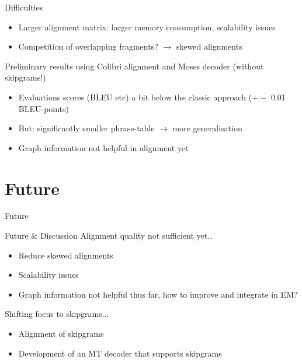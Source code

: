 \documentclass[compress]{beamer}
\begin{document}
\begin{frame}
	\begin{block}{Difficulties}
		\begin{itemize}
			\item Larger alignment matrix: larger memory consumption, scalability issues
			\item Competition of overlapping fragments? $\rightarrow$ skewed alignments
		\end{itemize}
	\end{block}

	\begin{block}{Preliminary results using Colibri alignment and Moses decoder (without skipgrams!)}
		\begin{itemize}
			\item Evaluations scores (BLEU etc) a bit below the classic approach ($+-$ 0.01 BLEU-points)
			\item But: significantly smaller phrase-table $\rightarrow$ more generalisation
			\item Graph information not helpful in alignment yet
		\end{itemize}
	\end{block}
\end{frame}




\section{Future}

\begin{frame}{Future}

	\begin{block}{Future \& Discussion}
		Alignment quality not sufficient yet..
		\begin{itemize}
			\item Reduce skewed alignments
			\item Scalability issues
			\item Graph information not helpful thus far, how to improve and integrate in EM?
		\end{itemize}

		Shifting focus to skipgrams...
		\begin{itemize}
			\item Alignment of skipgrams
			\item Development of an MT decoder that supports skipgrams
		\end{itemize}
	\end{block}
\end{frame}
\end{document}
